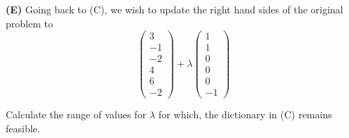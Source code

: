 \documentclass[11pt]{article}
\begin{document}
\noindent\textbf{(E)} Going back to (C), we wish to update the right
hand sides of the original problem to 
\[ \left( \begin{array}{l} 3 \\ -1 \\ -2 \\ 4 \\ 6 \\ -2 \end{array}
  \right) + \lambda \left( \begin{array}{l}
1 \\ 1\\ 0 \\ 0\\ 0 \\ -1 \end{array} \right) \]

Calculate the range of values for $\lambda$ for which, the dictionary
in (C) remains feasible.
\end{document}

